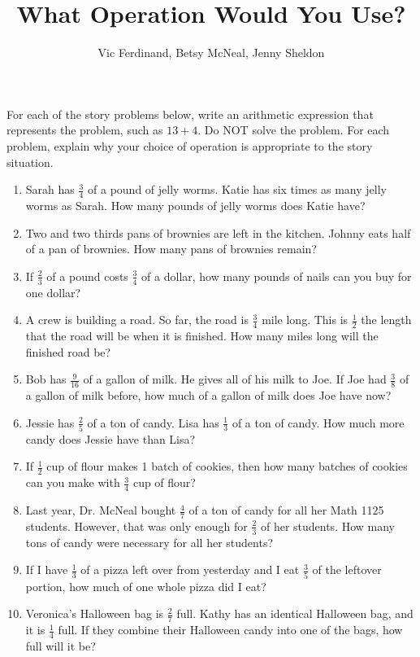 \documentclass{ximera}
\title{What Operation Would You Use?}
\author{Vic Ferdinand, Betsy McNeal, Jenny Sheldon}
\begin{document}
\begin{abstract} \end{abstract}
\maketitle


\begin{problem}
For each of the story problems below, write an arithmetic expression that represents the problem, such as $13+4$.  Do NOT solve the problem.  For each problem, explain why your choice of operation is appropriate to the story situation.

\vskip 0.1in

\begin{enumerate}\itemsep0.7in

	\item Sarah has $\frac34$ of a pound of jelly worms.  Katie has six times as many jelly worms as Sarah.  How many pounds of jelly worms does Katie have?
	
	\item Two and two thirds pans of brownies are left in the kitchen.  Johnny eats half of a pan of brownies.  How many pans of brownies remain?

	\item  If $\frac23$ of a pound costs $\frac34$ of a dollar,  how many pounds of nails can you buy for one dollar?

	\item  A crew is building a road.  So far, the road is $\frac34$ mile long.  This is $\frac12$ the length that the road will be when it is finished.  How many miles long will the finished road be?

	\item  Bob has $\frac{9}{16}$ of a gallon of milk.  He gives all of his milk to Joe.  If Joe had $\frac38$ of a gallon of milk before, how much of a gallon of milk does Joe have now?
	
	\item Jessie has $\frac25$ of a ton of candy.  Lisa has $\frac13$ of a ton of candy.  How much more candy does Jessie have than Lisa?

	\item If $\frac12$ cup of flour makes 1 batch of cookies, then how many batches of cookies can you make with $\frac34$ cup of flour?
	
	\item Last year, Dr. McNeal bought $\frac47$ of a ton of candy for all her Math 1125 students.  However, that was only enough for $\frac23$ of her students.  How many tons of candy were necessary for all her students?

	\item  If I have $\frac13$ of a pizza left over from yesterday and I eat $\frac35$ of the leftover portion, how much of one whole pizza did I eat?
		
	\item Veronica's Halloween bag is $\frac27$ full.  Kathy has an identical Halloween bag, and it is $\frac14$ full.  If they combine their Halloween candy into one of the bags, how full will it be?

\end{enumerate}
\end{problem}
\end{document}
